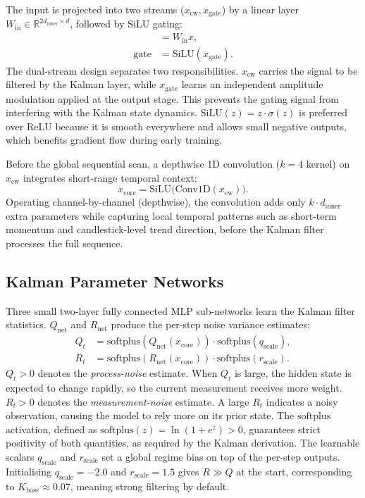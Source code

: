 The input is projected into two streams ($x_\text{cw}, x_\text{gate}$) by a
linear layer $W_\text{in} \in \mathbb{R}^{2d_\text{inner} \times d}$,
followed by SiLU gating:
\begin{align}
    [x_\text{cw}, x_\text{gate}] &= W_\text{in} x, \\
    \text{gate} &= \mathrm{SiLU}(x_\text{gate}).
\end{align}
The dual-stream design separates two responsibilities. $x_\text{cw}$ carries
the signal to be filtered by the Kalman layer, while $x_\text{gate}$ learns an
independent amplitude modulation applied at the output stage.
This prevents the gating signal from interfering with the Kalman state dynamics.
$\mathrm{SiLU}(z) = z \cdot \sigma(z)$ is preferred over ReLU because it is
smooth everywhere and allows small negative outputs, which benefits gradient
flow during early training.

Before the global sequential scan, a depthwise 1D convolution ($k=4$ kernel)
on $x_\text{cw}$ integrates short-range temporal context:
\begin{equation}
    x_\text{core} = \mathrm{SiLU}\bigl(\mathrm{Conv1D}(x_\text{cw})\bigr).
\end{equation}
Operating channel-by-channel (depthwise), the convolution adds only
$k \cdot d_\text{inner}$ extra parameters while capturing local temporal
patterns such as short-term momentum and candlestick-level trend direction,
before the Kalman filter processes the full sequence.

\subsection{Kalman Parameter Networks}

Three small two-layer fully connected MLP sub-networks learn the Kalman filter statistics.
$Q_\text{net}$ and $R_\text{net}$ produce the per-step noise variance estimates:
\begin{align}
    Q_t &= \mathrm{softplus}(Q_\text{net}(x_\text{core})) \cdot
           \mathrm{softplus}(q_\text{scale}), \label{eq:Q_net}\\
    R_t &= \mathrm{softplus}(R_\text{net}(x_\text{core})) \cdot
           \mathrm{softplus}(r_\text{scale}). \label{eq:R_net}
\end{align}
$Q_t > 0$ denotes the \emph{process-noise} estimate. When $Q_t$ is large, the
hidden state is expected to change rapidly, so the current measurement
receives more weight.
$R_t > 0$ denotes the \emph{measurement-noise} estimate. A large $R_t$
indicates a noisy observation, causing the model to rely more on its prior state.
The $\mathrm{softplus}$ activation, defined as $\mathrm{softplus}(z) = \ln(1 + e^z) > 0$,
guarantees strict positivity of both quantities, as required by the Kalman
derivation.
The learnable scalars $q_\text{scale}$ and $r_\text{scale}$ set a global
regime bias on top of the per-step outputs.
Initialising $q_\text{scale} = -2.0$ and $r_\text{scale} = 1.5$ gives
$R \gg Q$ at the start, corresponding to $K_\text{base} \approx 0.07$,
meaning strong filtering by default.

